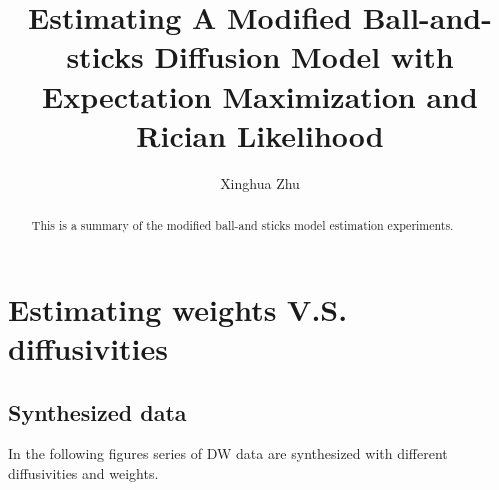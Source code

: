 \documentclass{article}
\begin{document}
\title{Estimating A Modified Ball-and-sticks Diffusion Model with Expectation Maximization and Rician Likelihood}
\author{Xinghua Zhu}

\maketitle

\begin{abstract}
  This is a summary of the modified ball-and sticks model estimation experiments.
\end{abstract}



\section{Estimating weights V.S. diffusivities}
\subsection{Synthesized data}

In the following figures series of DW data are synthesized with different diffusivities and weights.
\end{document}

